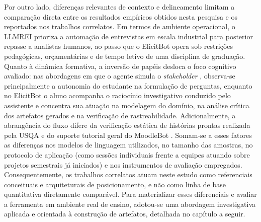 Por outro lado, diferenças relevantes de contexto e delineamento limitam a comparação direta entre os resultados empíricos obtidos nesta pesquisa e os reportados nos trabalhos correlatos. Em termos de ambiente operacional, o LLMREI \cite{korn2025} prioriza a automação de entrevistas em escala industrial para posterior repasse a analistas humanos, ao passo que o ElicitBot opera sob restrições pedagógicas, orçamentárias e de tempo letivo de uma disciplina de graduação. Quanto à dinâmica formativa, a inversão de papéis desloca o foco cognitivo avaliado: nas abordagens em que o agente simula o \textit{stakeholder} \cite{lojo2025, schon2026}, observa-se principalmente a autonomia do estudante na formulação de perguntas, enquanto no ElicitBot o aluno acompanha o raciocínio investigativo conduzido pelo assistente e concentra sua atuação na modelagem do domínio, na análise crítica dos artefatos gerados e na verificação de rastreabilidade. Adicionalmente, a abrangência do fluxo difere da verificação estática de histórias prontas realizada pela USQA \cite{jimenez2023} e do suporte tutorial geral do MoodleBot \cite{neumann2025}. Somam-se a esses fatores as diferenças nos modelos de linguagem utilizados, no tamanho das amostras, no protocolo de aplicação (como sessões individuais frente a equipes atuando sobre projetos semestrais já iniciados) e nos instrumentos de avaliação empregados. Consequentemente, os trabalhos correlatos atuam neste estudo como referenciais conceituais e arquiteturais de posicionamento, e não como linha de base quantitativa diretamente comparável. Para materializar esses diferenciais e avaliar a ferramenta em ambiente real de ensino, adotou-se uma abordagem investigativa aplicada e orientada à construção de artefatos, detalhada no capítulo a seguir.